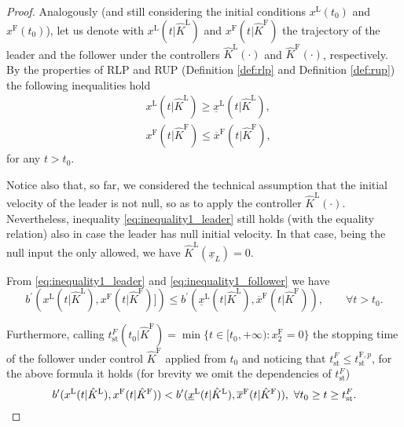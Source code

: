 \documentclass[letterpaper, 10 pt, conference]{ieeeconf}
\newcounter{Definition}
\theoremstyle{definition}
\theoremstyle{nopoint}
\begin{document}
\begin{proof}
	
	Analogously (and still considering the initial conditions $x^\mathrm{L}(t_0)$ and $x^\mathrm{F}(t_0)$), let us denote with $x^\mathrm{L}(t | \hat{K}^\mathrm{L})$  and $x^\mathrm{F}(t | \hat{K}^\mathrm{F})$ the trajectory of the leader and the follower under the controllers $\hat{K}^\mathrm{L}(\cdot)$ and $\hat{K}^\mathrm{F}(\cdot)$, respectively.
	By the properties of RLP and RUP (Definition \ref{def:rlp} and Definition \ref{def:rup}) the following inequalities hold
	\begin{eqnarray}
		&x^\mathrm{L}(t | \hat{K}^\mathrm{L})\geq \underline{x}^\mathrm{L}(t | \hat{K}^\mathrm{L}), \label{eq:inequality1_leader}\\
		& x^\mathrm{F}(t | \hat{K}^\mathrm{F})\leq \overline{x}^\mathrm{F}(t | \hat{K}^\mathrm{F}),\label{eq:inequality1_follower}
	\end{eqnarray}
	for any $t>t_0$.
	
	Notice also that, so far, we considered the technical assumption that the initial velocity of the leader is not null, so as to apply the controller $\hat{K}^\mathrm{L}(\cdot)$. Nevertheless, inequality \eqref{eq:inequality1_leader} still holds (with the equality relation) also in case the leader has null initial velocity. In that case, being the null input the only allowed, we have $\hat{K}^\mathrm{L}(\underline{x}_L)=0$.
	
	From \eqref{eq:inequality1_leader} and \eqref{eq:inequality1_follower} we have 
	\begin{equation}\label{eq:decrease_b_prime_proxies}
		b^\prime(x^\mathrm{L}(t | \hat{K}^\mathrm{L}),x^\mathrm{F}(t |\hat{K}^\mathrm{F})])\leq  b^\prime(\underline{x}^\mathrm{L}(t | \hat{K}^\mathrm{L}),\overline{x}^\mathrm{F}(t | \hat{K}^\mathrm{F})), \qquad \forall t>t_0. 
	\end{equation}
	
	Furthermore, calling $t_{\mathrm{st}}^{F}(t_0 |\hat{K}^\mathrm{F})= \min\{t\in[t_0, +\infty): x_2^\mathrm{F}=0\}$ the stopping time of the follower under control $\hat{K}^\mathrm{F}$ applied from $t_0$ and noticing that $t_{\mathrm{st}}^{F}\leq t_{\mathrm{st}}^{\mathrm{F},p}$, for the above formula it holds (for brevity we omit the dependencies of $t_{\mathrm{st}}^{F}$)
	\begin{equation*}
		b^\prime(x^\mathrm{L}(t | \hat{K}^\mathrm{L}),x^\mathrm{F}(t |\hat{K}^\mathrm{F}))<  b^\prime(\underline{x}^\mathrm{L}(t | \hat{K}^\mathrm{L}),\overline{x}^\mathrm{F}(t | \hat{K}^\mathrm{F})), \,\, \forall t_0\geq t\geq t_{\mathrm{st}}^{F} \\ . 
	\end{equation*}
	

\end{proof}
\end{document}

